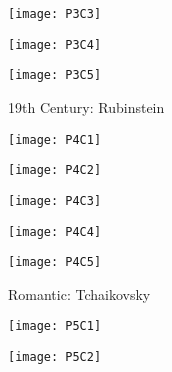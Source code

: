 \begin{figure}
\centering
\begin{minipage}{.5\textwidth}
  \centering
  \texttt{[image: P3C3]}
  \label{fig:test1}
\end{minipage}%
\begin{minipage}{.5\textwidth}
  \centering
  \texttt{[image: P3C4]}
  \label{fig:test2}
\end{minipage}
\end{figure}

\begin{figure}[h]
\caption{19th Century: Rubinstein}
\centering
\texttt{[image: P3C5]}
\end{figure}

\begin{figure}
\centering
\begin{minipage}{.5\textwidth}
  \centering
  \texttt{[image: P4C1]}
  \label{fig:test1}
\end{minipage}%
\begin{minipage}{.5\textwidth}
  \centering
  \texttt{[image: P4C2]}
  \label{fig:test2}
\end{minipage}
\end{figure}

\begin{figure}
\centering
\begin{minipage}{.5\textwidth}
  \centering
  \texttt{[image: P4C3]}
  \label{fig:test1}
\end{minipage}%
\begin{minipage}{.5\textwidth}
  \centering
  \texttt{[image: P4C4]}
  \label{fig:test2}
\end{minipage}
\end{figure}

\begin{figure}[h]
\caption{Romantic: Tchaikovsky}
\centering
\texttt{[image: P4C5]}
\end{figure}

\begin{figure}
\centering
\begin{minipage}{.5\textwidth}
  \centering
  \texttt{[image: P5C1]}
  \label{fig:test1}
\end{minipage}%
\begin{minipage}{.5\textwidth}
  \centering
  \texttt{[image: P5C2]}
  \label{fig:test2}
\end{minipage}
\end{figure}

